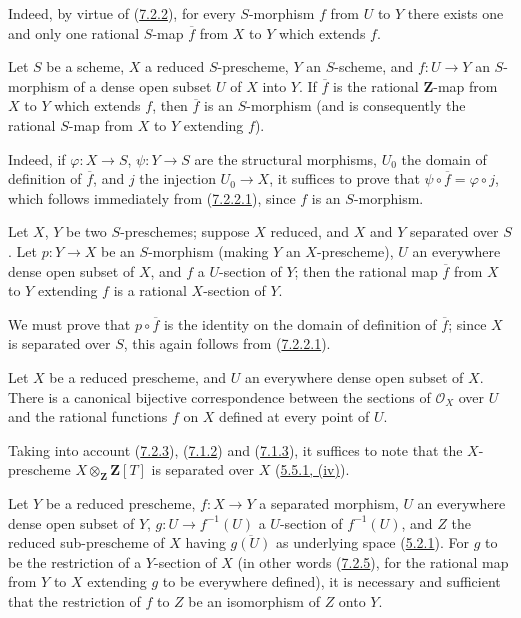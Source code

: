 Indeed, by virtue of (\hyperref[I.7.2.2]{7.2.2}), for every $S$-morphism
$f$ from $U$ to $Y$ there exists one and only one rational $S$-map
$\overline f$ from $X$ to $Y$ which extends $f$.

\begin{corollary}[7.2.4]
\label{I.7.2.4}
Let $S$ be a scheme, $X$ a reduced $S$-prescheme, $Y$ an $S$-scheme, and
$f:U\to Y$ an $S$-morphism of a dense open subset $U$ of $X$ into $Y$. If
$\overline f$ is the rational $\mathbf{Z}$-map from $X$ to $Y$ which
extends $f$, then $\overline f$ is an $S$-morphism (and is consequently the
rational $S$-map from $X$ to $Y$ extending $f$).
\end{corollary}

Indeed, if $\varphi:X\to S$, $\psi:Y\to S$ are the structural morphisms,
$U_0$ the domain of definition of $\overline f$, and $j$ the injection
$U_0\to X$, it suffices to prove that $\psi\circ\overline f=\varphi\circ j$,
which follows immediately from (\hyperref[I.7.2.2.1]{7.2.2.1}), since $f$
is an $S$-morphism.

\begin{corollary}[7.2.5]
\label{I.7.2.5}
Let $X$, $Y$ be two $S$-preschemes; suppose $X$ reduced, and $X$ and $Y$
separated over $S$. Let $p:Y\to X$ be an $S$-morphism (making $Y$ an
$X$-prescheme), $U$ an everywhere dense open subset of $X$, and $f$ a
$U$-section of $Y$; then the rational map $\overline f$ from $X$ to $Y$
extending $f$ is a rational $X$-section of $Y$.
\end{corollary}

We must prove that $p\circ\overline f$ is the identity on the domain of
definition of $\overline f$; since $X$ is separated over $S$, this again
follows from (\hyperref[I.7.2.2.1]{7.2.2.1}).

\begin{corollary}[7.2.6]
\label{I.7.2.6}
Let $X$ be a reduced prescheme, and $U$ an everywhere dense open subset of
$X$. There is a canonical bijective correspondence between the sections of
$\mathscr{O}_X$ over $U$ and the rational functions $f$ on $X$ defined at
every point of $U$.
\end{corollary}

Taking into account (\hyperref[I.7.2.3]{7.2.3}),
(\hyperref[I.7.1.2]{7.1.2}) and (\hyperref[I.7.1.3]{7.1.3}), it
suffices to note that the $X$-prescheme $X\otimes_{\mathbf Z}\mathbf Z[T]$ is
separated over $X$ (\hyperref[I.5.5.1]{5.5.1, (iv)}).

\begin{corollary}[7.2.7]
\label{I.7.2.7}
Let $Y$ be a reduced prescheme, $f:X\to Y$ a separated morphism, $U$ an
everywhere dense open subset of $Y$, $g:U\to f^{-1}(U)$ a $U$-section of
$f^{-1}(U)$, and $Z$ the reduced sub-prescheme of $X$ having
$\overline{g(U)}$ as underlying space
(\hyperref[I.5.2.1]{5.2.1}). For $g$ to be the restriction of a
$Y$-section of $X$ (in other words (\hyperref[I.7.2.5]{7.2.5}), for the
rational map from $Y$ to $X$ extending $g$ to be everywhere defined), it is
necessary and sufficient that the restriction of $f$ to $Z$ be an
isomorphism of $Z$ onto $Y$.
\end{corollary}

